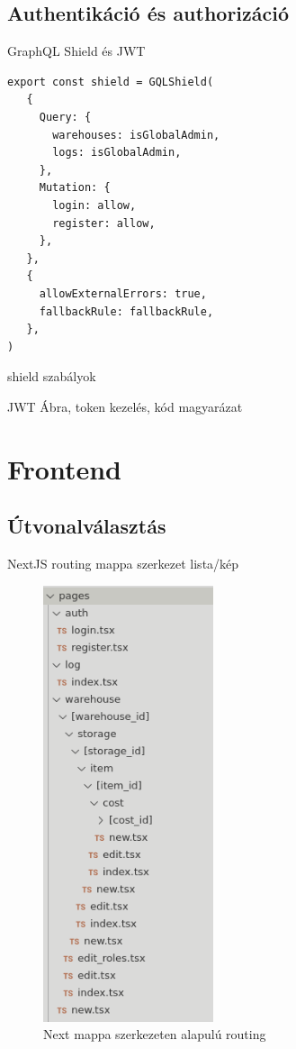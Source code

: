 \subsection{Authentikáció és authorizáció}
GraphQL Shield és JWT

\begin{lstlisting}[style=ES6, caption={GraphQL Shield}]
export const shield = GQLShield(
   {
     Query: {
       warehouses: isGlobalAdmin,
       logs: isGlobalAdmin,
     },
     Mutation: {
       login: allow,
       register: allow,
     },
   },
   {
     allowExternalErrors: true,
     fallbackRule: fallbackRule,
   },
)
\end{lstlisting}

shield szabályok

JWT Ábra, token kezelés, kód magyarázat



\section{Frontend}


\subsection{Útvonalválasztás}
NextJS routing mappa szerkezet lista/kép
\begin{figure}[!ht]
  \centering
  \includegraphics[width=50mm, keepaspectratio]{figures/next_routing.png}
  \caption{Next mappa szerkezeten alapulú routing}
  \label{fig:NextRouting}
\end{figure}

